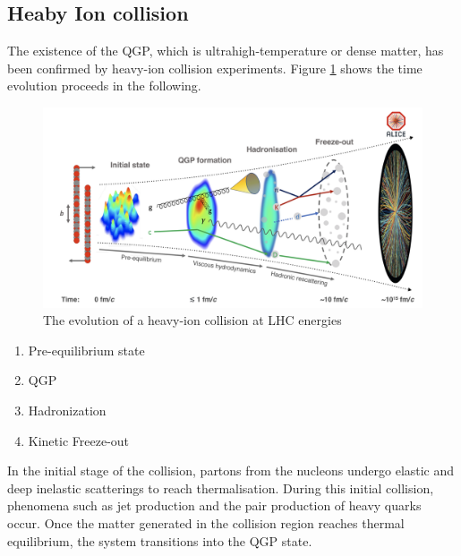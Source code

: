     \subsection{Heaby Ion collision}
        The existence of the QGP, which is ultrahigh-temperature or dense matter, has been confirmed by heavy-ion collision experiments. Figure  \ref{Intro:HIC:space_time_evaluation_of_HIC} shows the time evolution proceeds in the following.
        \begin{figure}[hbtp]
            \centering
            \includegraphics[keepaspectratio, scale=0.4]{fig/1_5_QGP_Evol.png}
            \caption{The evolution of a heavy-ion collision at LHC energies\cite{QGP_evo}}
            \label{Intro:HIC:space_time_evaluation_of_HIC}
        \end{figure}
        \begin{enumerate}
            \item Pre-equilibrium state
            \item QGP
            \item Hadronization
            \item Kinetic Freeze-out
        \end{enumerate}
        In the initial stage of the collision, partons from the nucleons undergo elastic and deep inelastic scatterings to reach thermalisation. During this initial collision, phenomena such as jet production and the pair production of heavy quarks occur. Once the matter generated in the collision region reaches thermal equilibrium, the system transitions into the QGP state.  
        

